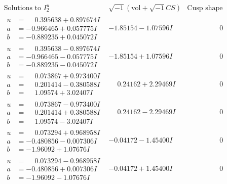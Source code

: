 \documentclass[1p]{elsarticle_modified}
\theoremstyle{definition}
\newcommand{\I}{\sqrt{-1}}
\begin{document}
$$\begin{array}{c|c|c}  
\text{Solutions to }I^u_{2}& \I (\text{vol} + \sqrt{-1}CS) & \text{Cusp shape}\\
 \hline 
\begin{aligned}
u &= \phantom{-}0.395638 + 0.897674 I \\
a &= -0.966465 + 0.057775 I \\
b &= -0.889235 + 0.045072 I\end{aligned}
 & -1.85154 - 1.07596 I & \phantom{-0.000000 } 0 \\ \hline\begin{aligned}
u &= \phantom{-}0.395638 - 0.897674 I \\
a &= -0.966465 - 0.057775 I \\
b &= -0.889235 - 0.045072 I\end{aligned}
 & -1.85154 + 1.07596 I & \phantom{-0.000000 } 0 \\ \hline\begin{aligned}
u &= \phantom{-}0.073867 + 0.973400 I \\
a &= \phantom{-}0.201414 - 0.380588 I \\
b &= \phantom{-}1.09574 + 3.02407 I\end{aligned}
 & \phantom{-}0.24162 + 2.29469 I & \phantom{-0.000000 } 0 \\ \hline\begin{aligned}
u &= \phantom{-}0.073867 - 0.973400 I \\
a &= \phantom{-}0.201414 + 0.380588 I \\
b &= \phantom{-}1.09574 - 3.02407 I\end{aligned}
 & \phantom{-}0.24162 - 2.29469 I & \phantom{-0.000000 } 0 \\ \hline\begin{aligned}
u &= \phantom{-}0.073294 + 0.968958 I \\
a &= -0.480856 - 0.007306 I \\
b &= -1.96092 + 1.07676 I\end{aligned}
 & -0.04172 - 1.45400 I & \phantom{-0.000000 } 0 \\ \hline\begin{aligned}
u &= \phantom{-}0.073294 - 0.968958 I \\
a &= -0.480856 + 0.007306 I \\
b &= -1.96092 - 1.07676 I\end{aligned}
 & -0.04172 + 1.45400 I & \phantom{-0.000000 } 0 \\ \hline\begin{aligned}

\end{aligned}
\end{array}$$
\end{document}
